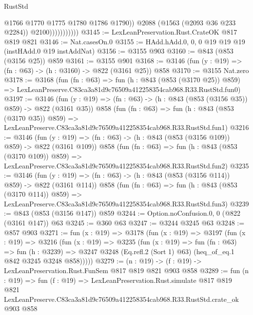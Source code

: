 \begin{lexlean}{RustStd}
\begin{coremodule}
                              @1766
                              @1770
                              @1775
                              @1780
                              @1786
                              @1790))
                          @2088
                          (@1563 (@2093 @36 @233 @2284))
                          @2100)))))))))))
@3145 := LexLeanPreservation.Rust.CrateOK @817 @819 @821
@3146 := Nat.casesOn.{0}
@3155 := HAdd.hAdd.{0, 0, 0} @19 @19 @19 (instHAdd.{0} @19 instAddNat)
@3156 := @3155 @903
@3160 := @843 (@853 (@3156 @25)) @859
@3161 := @3155 @901
@3168 := @3146 (fun (y : @19) => (fn : @63) -> (h : @3160) -> @822 (@3161 @25)) @858
@3170 := @3155 Nat.zero
@3178 := @3168
    (fun (fn : @63) =>
    fun (h : @843 (@853 (@3170 @25)) @859) =>
    LexLeanPreserve.C83ca3a81d9c76509a412258354cab968.R33.RustStd.fun0)
@3197 := @3146
    (fun (y : @19) => (fn : @63) -> (h : @843 (@853 (@3156 @35)) @859) -> @822 (@3161 @35))
    @858
    (fun (fn : @63) =>
    fun (h : @843 (@853 (@3170 @35)) @859) =>
    LexLeanPreserve.C83ca3a81d9c76509a412258354cab968.R33.RustStd.fun1)
@3216 := @3146
    (fun (y : @19) => (fn : @63) -> (h : @843 (@853 (@3156 @109)) @859) -> @822 (@3161 @109))
    @858
    (fun (fn : @63) =>
    fun (h : @843 (@853 (@3170 @109)) @859) =>
    LexLeanPreserve.C83ca3a81d9c76509a412258354cab968.R33.RustStd.fun2)
@3235 := @3146
    (fun (y : @19) => (fn : @63) -> (h : @843 (@853 (@3156 @114)) @859) -> @822 (@3161 @114))
    @858
    (fun (fn : @63) =>
    fun (h : @843 (@853 (@3170 @114)) @859) =>
    LexLeanPreserve.C83ca3a81d9c76509a412258354cab968.R33.RustStd.fun3)
@3239 := @843 (@853 (@3156 @147)) @859
@3244 := Option.noConfusion.{0, 0} (@822 (@3161 @147)) @63
@3245 := @360 @63
@3247 := @3244 @3245 @63
@3248 := @857 @903
@3271 := fun (x : @19) =>
  @3178
    (fun (x : @19) =>
    @3197
      (fun (x : @19) =>
      @3216
        (fun (x : @19) =>
        @3235
          (fun (x : @19) =>
          fun (fn : @63) =>
          fun (h : @3239) =>
          @3247 @3248 (Eq.refl.{2} (Sort 1) @63) (heq_of_eq.{1} @842 @3245 @3248 @858)))))
@3279 := (n : @19) -> (f : @19) -> LexLeanPreservation.Rust.FunSem @817 @819 @821 @903 @858
@3289 := fun (n : @19) =>
  fun (f : @19) =>
  LexLeanPreservation.Rust.simulate
    @817
    @819
    @821
    LexLeanPreserve.C83ca3a81d9c76509a412258354cab968.R33.RustStd.crate_ok
    @903
    @858
\end{coremodule}
\end{lexlean}
